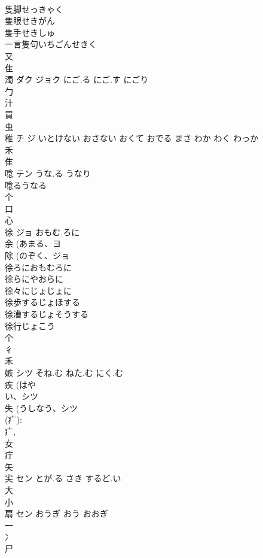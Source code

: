 \documentclass[8pt]{extreport}
\begin{document}
\begin{CJK}{UTF8}{min}
\\	隻脚せっきゃく
\\	隻眼せきがん
\\	隻手せきしゅ
\\	一言隻句いちごんせきく
\\	又 
\\	隹 
\\	濁	ダク ジョク	にご.る にご.す にごり	
\\	勹 
\\	汁 
\\	買 
\\	虫 
\\	稚	チ ジ	いとけない おさない おくて おでる まさ わか わく わっか	
\\	禾 
\\	隹 
\\	唸	テン	うな.る うなり	
\\	唸るうなる
\\	个 
\\	口 
\\	心 
\\	徐	ジョ	おもむ.ろに	
\\	余 (あまる、ヨ 
\\	除 (のぞく、ジョ 
\\	徐ろにおもむろに
\\	徐らにやおらに
\\	徐々にじょじょに
\\	徐歩するじょほする
\\	徐漕するじょそうする
\\	徐行じょこう
\\	个 
\\	彳 
\\	禾 
\\	嫉	シツ	そね.む ねた.む にく.む	
\\	疾 (はや
\\	い、シツ 
\\	失 (うしなう、シツ 
\\	(疒): 
\\	疒, 
\\	女 
\\	疔 
\\	矢 
\\	尖	セン	とが.る さき するど.い	
\\	大 
\\	小 
\\	扇	セン	おうぎ おう おおぎ	
\\	一 
\\	冫 
\\	尸 

\end{CJK}
\end{document}
